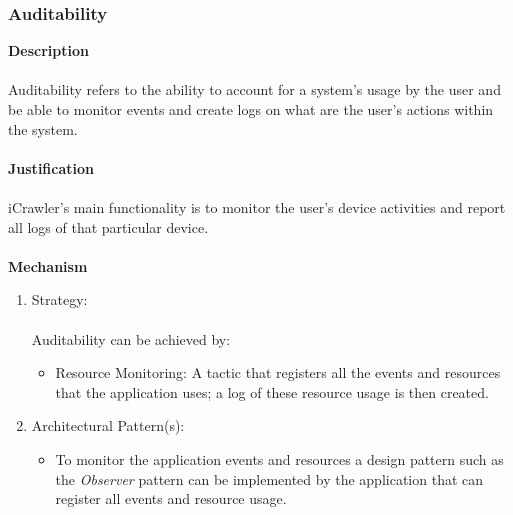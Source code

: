 \documentclass[hidelinks, 12pt, oneside]{article}
\begin{document}
			\subsubsection*{Auditability}
			\textbf{Description} \\\\
			Auditability refers to the ability to account for a system's usage by the user and be able to monitor events and create logs on what are the user's actions within the system.\\\\
			\textbf{Justification}\\\\
			iCrawler's main functionality is to monitor the user's device activities and report all logs of that particular device.\\\\
			\textbf{Mechanism}
				\begin{enumerate}
					\item Strategy: \\\\
						Auditability can be achieved by:
						\begin{itemize}
							\item Resource Monitoring: A tactic that registers all the events and resources that the application uses; a log of these resource usage is then created.  
						\end{itemize}
					\item Architectural Pattern(s):
						\begin{itemize}
							\item To monitor the application events and resources a design pattern such as the \emph{Observer} pattern can be implemented by the application that can register all events and resource usage. 
						\end{itemize}
				\end{enumerate}	
			\newpage
\end{document}
